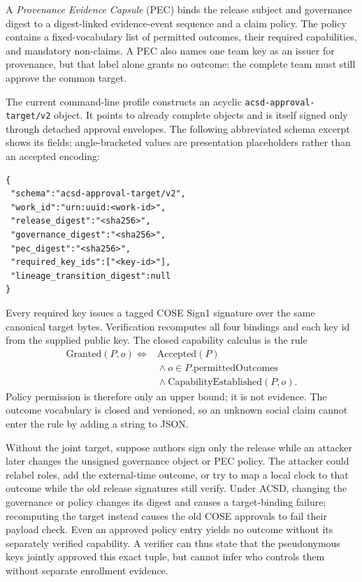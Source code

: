 \documentclass[conference,compsoc]{IEEEtran}
\begin{document}
A \emph{Provenance Evidence Capsule} (PEC) binds the release subject and
governance digest to a digest-linked evidence-event sequence and a claim
policy. The policy contains a fixed-vocabulary list of permitted outcomes,
their required capabilities, and mandatory non-claims. A PEC also names one
team key as an issuer for provenance, but that label alone grants no outcome:
the complete team must still approve the common target.

The current command-line profile constructs an acyclic
\texttt{acsd-approval-target/v2} object. It points to already complete objects
and is itself signed only through detached approval envelopes. The following
abbreviated schema excerpt shows its fields; angle-bracketed values are
presentation placeholders rather than an accepted encoding:

\begingroup\scriptsize
\begin{verbatim}
{
 "schema":"acsd-approval-target/v2",
 "work_id":"urn:uuid:<work-id>",
 "release_digest":"<sha256>",
 "governance_digest":"<sha256>",
 "pec_digest":"<sha256>",
 "required_key_ids":["<key-id>"],
 "lineage_transition_digest":null
}
\end{verbatim}
\endgroup

Every required key issues a tagged COSE Sign1 signature over the same
canonical target bytes. Verification recomputes all four bindings and each key
id from the supplied public key. The closed capability calculus is the rule
\[
\begin{aligned}
 \mathrm{Granted}(P,o) \iff{}& \mathrm{Accepted}(P) \\
 &{}\land o\in P.\mathrm{permittedOutcomes} \\
 &{}\land \mathrm{CapabilityEstablished}(P,o).
\end{aligned}
\]
Policy permission is therefore only an upper bound; it is not evidence. The
outcome vocabulary is closed and versioned, so an unknown social claim
cannot enter the rule by adding a string to JSON.

Without the joint target, suppose authors sign only the release while an
attacker later changes the unsigned governance object or PEC policy. The
attacker could relabel roles, add the external-time outcome, or try to map a
local clock to that outcome while the old release signatures still verify.
Under ACSD, changing the governance or policy changes its digest and causes a
target-binding failure; recomputing the target instead causes the old COSE
approvals to fail their payload check. Even an approved policy entry yields no
outcome without its separately verified capability. A verifier can thus state
that the pseudonymous keys jointly approved this exact tuple, but cannot infer
who controls them without separate enrollment evidence.
\end{document}
